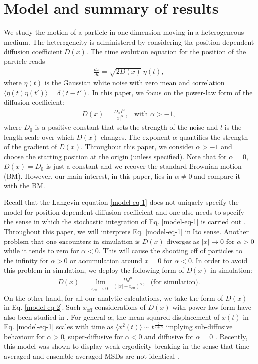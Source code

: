 \documentclass[showpacs,amsmath,amssymb,aps,pre,twocolumn,]{revtex4-1}
\def\greenw#1{{\color{black} #1}}
\def\bluew#1{{\color{black} #1}}
\begin{document}
\section{Model and summary of results}
\label{model}
We study the motion of a particle in one dimension moving in a heterogeneous medium. The heterogeneity is administered by considering the position-dependent diffusion coefficient $D(x)$. The time evolution equation for the position of the particle reads
\begin{align}
\frac{dx}{dt} = \sqrt{2 D(x)} ~\eta(t),
\label{model-eq-1}
\end{align}
where $\eta(t)$ is the Gaussian white noise with zero mean and correlation $\langle \eta(t) \eta(t') \rangle = \delta(t-t')$. In this paper, we focus on the power-law form of the diffusion coefficient:
\begin{align}
D(x) =  \frac{D_0~l^{\alpha}}{|x|^{\alpha}},~~~~\text{with }\alpha >-1,
\label{model-eq-2}
\end{align}
where $D_0$ is a positive constant that sets the strength of the noise and $l$ is the length scale over which $D(x)$ changes. The exponent $\alpha$ quantifies the strength of the gradient of $D(x)$. Throughout this paper, we consider $\alpha >-1$ and choose the starting position at the origin (unless specified). Note that for $\alpha =0$, $D(x)=D_0$ is just a constant and we recover the standard Brownian motion (BM). However, our main interest, in this paper, lies in $\alpha \neq 0$ and compare it with the BM.

Recall that the Langevin equation \eqref{model-eq-1} does not uniquely specify the model for position-dependent diffusion coefficient and one also needs to specify the sense in which the stochastic integration of Eq. \eqref{model-eq-1} is carried out \bluew{\cite{Vankampen1981, Lau2007}}. Throughout this paper, we will interprete Eq. \eqref{model-eq-1} in Ito sense. \greenw{ Another problem that one encounters in simulation is $D(x)$ diverges as $|x| \to 0$ for $\alpha >0$ while it tends to zero for $\alpha <0$. This will cause the shooting off of particles to the infinity for $\alpha >0$ or accumulation around $x=0$ for $\alpha < 0$.} In order to avoid this problem in simulation, we deploy the following form of $D(x)$ in simulation:
\begin{align}
D(x) = \lim _{x_{\text{off}} \to 0^+} \frac{D_0 l^{\alpha}}{\left(|x| + x_{\text{off}} \right)^{\alpha}},~~~\text{(for simulation)}.
\label{model-eq-3}
\end{align}
On the other hand, for all our analytic calculations, we take the form of $D(x)$ in Eq. \eqref{model-eq-2}. Such $x_{\text{off}}$-considerations of $D(x)$ with power-law form have also been studied in \bluew{\cite{Cherstvy2013,Cherstvy2014, Leibovich2019}}. For general $\alpha$, the mean-squared displacement of $x(t)$ in Eq. \eqref{model-eq-1} scales with time as $\langle x^2(t) \rangle \sim t^{\frac{2}{2+\alpha}}$ implying sub-diffusive behaviour for $\alpha >0$, super-diffusive for $\alpha <0$ and diffusive for $\alpha =0$ \bluew{\cite{Cherstvy2014}}. Recently, this model was shown to display weak ergodicity breaking in the sense that time averaged and ensemble averaged MSDs are not identical \bluew{\cite{Cherstvy2013}}.
\end{document}
